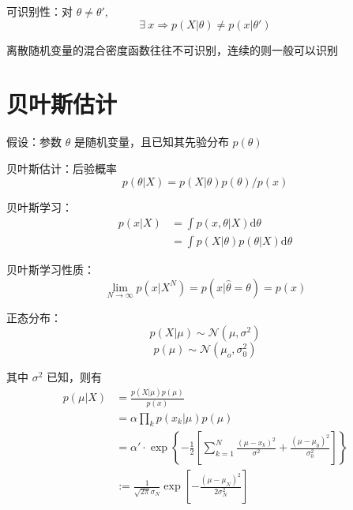 \documentclass[openany]{ctexbook}
\theoremstyle{kaiti}
\theoremstyle{normal}
\begin{document}
可识别性：对 $\theta \ne \theta '$, 
\begin{equation}
\exists~x\Rightarrow p(X|\theta)\ne p\left(x|\theta ' \right)
\end{equation}

离散随机变量的混合密度函数往往不可识别，连续的则一般可以识别

\section{贝叶斯估计}

假设：参数 $\theta$ 是随机变量，且已知其先验分布 $p(\theta)$

贝叶斯估计：后验概率
\begin{equation}
p\left(\theta |X \right)=p(X|\theta)p(\theta)/p(x)
\end{equation}

贝叶斯学习：
\begin{equation}
\begin{aligned}
  p\left(x|X \right)
  &=\int{p\left(x,\theta |X \right)\mathrm{d}\theta}\\
  &=\int{p(X|\theta)p\left(\theta |X \right)\mathrm{d}\theta}
\end{aligned}
\end{equation}

贝叶斯学习性质：
\begin{equation}
\lim_{N\rightarrow \infty} p\left(x|X^N \right)=p\left(x|\hat{\theta}=\theta \right)=p(x)
\end{equation}

正态分布：
\begin{equation}
p(X|\mu)\sim \mathcal{N} \left(\mu ,\sigma^2 \right)
\end{equation}
\begin{equation}
p(\mu)\sim \mathcal{N} \left(\mu_o,\sigma_{0}^{2} \right)
\end{equation}

其中 $\sigma^2$ 已知，则有
\begin{equation}
\begin{aligned}
  p(\mu|X)
  &=\frac{p(X|\mu)p(\mu)}{p(x)}\\
  &=\alpha \prod_kp\left(x_k|\mu \right)p(\mu)\\
  &=\alpha '\cdot \exp \left\{ -\frac{1}{2}\left[\sum_{k=1}^N{\frac{\left(\mu -x_k \right)^2}{\sigma^2}}+\frac{\left(\mu -\mu_0 \right)^2}{\sigma_{0}^{2}} \right] \right\} \\
  &:=\frac{1}{\sqrt{2\pi}\sigma_N}\exp \left[-\frac{\left(\mu -\mu_N \right)^2}{2\sigma_{N}^{2}} \right]
\end{aligned}
\end{equation}
\end{document}
